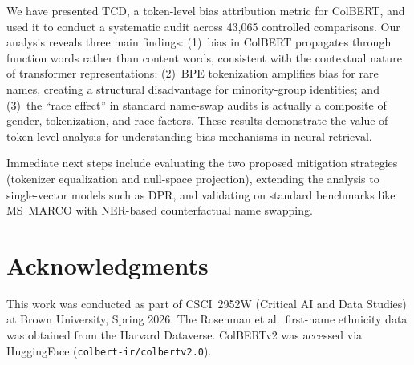 \documentclass[11pt]{article}
\begin{document}
We have presented TCD, a token-level bias attribution metric for ColBERT, and used it to conduct a systematic audit across 43{,}065 controlled comparisons. Our analysis reveals three main findings: (1)~bias in ColBERT propagates through function words rather than content words, consistent with the contextual nature of transformer representations; (2)~BPE tokenization amplifies bias for rare names, creating a structural disadvantage for minority-group identities; and (3)~the ``race effect'' in standard name-swap audits is actually a composite of gender, tokenization, and race factors. These results demonstrate the value of token-level analysis for understanding bias mechanisms in neural retrieval.

Immediate next steps include evaluating the two proposed mitigation strategies (tokenizer equalization and null-space projection), extending the analysis to single-vector models such as DPR, and validating on standard benchmarks like MS~MARCO with NER-based counterfactual name swapping.


\section*{Acknowledgments}

This work was conducted as part of CSCI~2952W (Critical AI and Data Studies) at Brown University, Spring 2026. The Rosenman et al.\ first-name ethnicity data was obtained from the Harvard Dataverse. ColBERTv2 was accessed via HuggingFace (\texttt{colbert-ir/colbertv2.0}).



\end{document}
